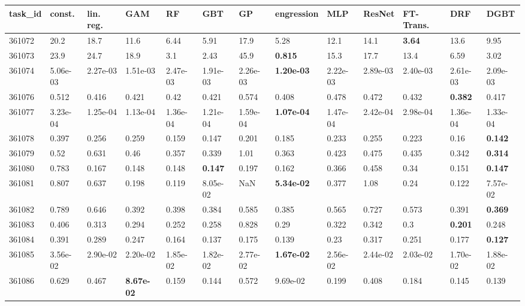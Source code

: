 \begin{table}[ht!]
\centering
\begingroup\footnotesize
\begin{tabular}{lllllllllllll}
  \hline
\hline
task\_id & const. & lin. reg. & GAM & RF & GBT & GP & engression & MLP & ResNet & FT-Trans. & DRF & DGBT \\ 
  \hline
361072 & 20.2 & 18.7 & 11.6 & 6.44 & 5.91 & 17.9 & 5.28 & 12.1 & 14.1 & \textbf{3.64} & 13.6 & 9.95 \\ 
  361073 & 23.9 & 24.7 & 18.9 & 3.1 & 2.43 & 45.9 & \textbf{0.815} & 15.3 & 17.7 & 13.4 & 6.59 & 3.02 \\ 
  361074 & 5.06e-03 & 2.27e-03 & 1.51e-03 & 2.47e-03 & 1.91e-03 & 2.26e-03 & \textbf{1.20e-03} & 2.22e-03 & 2.89e-03 & 2.40e-03 & 2.61e-03 & 2.09e-03 \\ 
  361076 & 0.512 & 0.416 & 0.421 & 0.42 & 0.421 & 0.574 & 0.408 & 0.478 & 0.472 & 0.432 & \textbf{0.382} & 0.417 \\ 
  361077 & 3.23e-04 & 1.25e-04 & 1.13e-04 & 1.36e-04 & 1.21e-04 & 1.59e-04 & \textbf{1.07e-04} & 1.47e-04 & 2.42e-04 & 2.98e-04 & 1.36e-04 & 1.33e-04 \\ 
  361078 & 0.397 & 0.256 & 0.259 & 0.159 & 0.147 & 0.201 & 0.185 & 0.233 & 0.255 & 0.223 & 0.16 & \textbf{0.142} \\ 
  361079 & 0.52 & 0.631 & 0.46 & 0.357 & 0.339 & 1.01 & 0.363 & 0.423 & 0.475 & 0.435 & 0.342 & \textbf{0.314} \\ 
  361080 & 0.783 & 0.167 & 0.148 & 0.148 & \textbf{0.147} & 0.197 & 0.162 & 0.366 & 0.458 & 0.34 & 0.151 & \textbf{0.147} \\ 
  361081 & 0.807 & 0.637 & 0.198 & 0.119 & 8.05e-02 & NaN & \textbf{5.34e-02} & 0.377 & 1.08 & 0.24 & 0.122 & 7.57e-02 \\ 
  361082 & 0.789 & 0.646 & 0.392 & 0.398 & 0.384 & 0.585 & 0.385 & 0.565 & 0.727 & 0.573 & 0.391 & \textbf{0.369} \\ 
  361083 & 0.406 & 0.313 & 0.294 & 0.252 & 0.258 & 0.828 & 0.29 & 0.322 & 0.342 & 0.3 & \textbf{0.201} & 0.248 \\ 
  361084 & 0.391 & 0.289 & 0.247 & 0.164 & 0.137 & 0.175 & 0.139 & 0.23 & 0.317 & 0.251 & 0.177 & \textbf{0.127} \\ 
  361085 & 3.56e-02 & 2.90e-02 & 2.20e-02 & 1.85e-02 & 1.82e-02 & 2.77e-02 & \textbf{1.67e-02} & 2.56e-02 & 2.44e-02 & 2.03e-02 & 1.70e-02 & 1.88e-02 \\ 
  361086 & 0.629 & 0.467 & \textbf{8.67e-02} & 0.159 & 0.144 & 0.572 & 9.69e-02 & 0.199 & 0.408 & 0.184 & 0.145 & 0.139 \\ 

\end{tabular}
\end{table}
